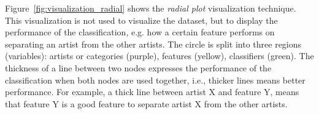 Figure~\ref{fig:visualization_radial} shows the \textit{radial plot} visualization technique.
This visualization is not used to visualize the dataset, but to display the performance of the classification, e.g. how a certain feature performs on separating an artist from the other artists.
The circle is split into three regions (variables): artists or categories (purple), features (yellow), classifiers (green).
The thickness of a line between two nodes expresses the performance of the classification when both nodes are used together, i.e., thicker lines means better performance.
For example, a thick line between artist X and feature Y, means that feature Y is a good feature to separate artist X from the other artists.
